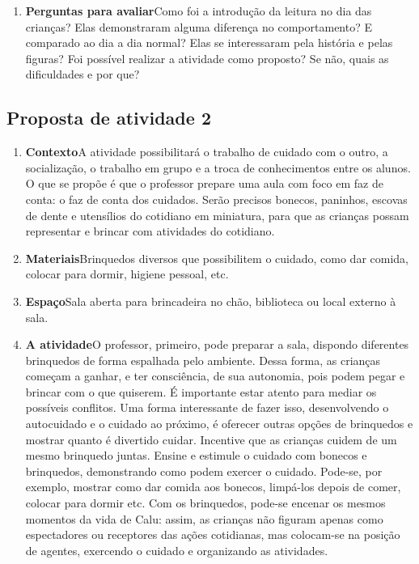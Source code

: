 \documentclass[11pt]{extarticle}
\begin{document}
\begin{enumerate}
\item \textbf{Perguntas para avaliar}\quad Como foi a introdução da leitura no dia das crianças? Elas demonstraram alguma diferença no comportamento? E comparado ao dia a dia normal? Elas se interessaram pela história e pelas figuras? Foi possível realizar a atividade como proposto? Se não, quais as dificuldades e por que? 
\end{enumerate}


\subsection{Proposta de atividade 2}


\begin{enumerate}
\item \textbf{Contexto}\quad A atividade possibilitará o trabalho de cuidado com o outro, a socialização, o trabalho em grupo e a troca de conhecimentos entre os alunos. O que se propõe é que o professor prepare uma aula com foco em faz de conta: o faz de conta dos cuidados. Serão precisos bonecos, paninhos, escovas de dente e utensílios do cotidiano em miniatura, para que as crianças possam representar e brincar com atividades do cotidiano.  

\item \textbf{Materiais}\quad Brinquedos diversos que possibilitem o cuidado, como dar comida, colocar para dormir, higiene pessoal, etc.

\item \textbf{Espaço}\quad Sala aberta para brincadeira no chão, biblioteca ou local externo à sala.

\item \textbf{A atividade}\quad O professor, primeiro, pode preparar a sala, dispondo diferentes brinquedos de forma espalhada pelo ambiente. Dessa forma, as crianças começam a ganhar, e ter consciência, de sua autonomia, pois podem pegar e  brincar com o que quiserem. É importante estar atento para mediar os possíveis conflitos. Uma forma interessante de fazer isso, desenvolvendo o autocuidado e o cuidado ao próximo, é oferecer outras opções de brinquedos e mostrar quanto é divertido cuidar. Incentive que as crianças cuidem de um mesmo brinquedo juntas. Ensine e estimule o cuidado com bonecos e brinquedos, demonstrando como podem exercer o cuidado. Pode-se, por exemplo, mostrar como dar comida aos bonecos, limpá-los depois de comer, colocar para dormir etc. Com os brinquedos, pode-se encenar os mesmos momentos da vida de Calu: assim, as crianças não figuram apenas como espectadores ou receptores das ações cotidianas, mas colocam-se na posição de agentes, exercendo o cuidado e organizando as atividades.


\end{enumerate}
\end{document}
